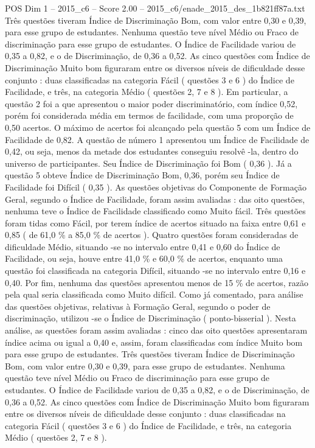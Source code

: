 \begin{textsample}{POS Dim 1 – 2015\_c6 – Score 2.00 – 2015\_c6/enade\_2015\_des\_1b821ff87a.txt}
Três questões tiveram Índice de Discriminação Bom, com valor entre 0,30 e 0,39, para esse grupo de estudantes.
Nenhuma questão teve nível Médio ou Fraco de discriminação para esse grupo de estudantes.
O Índice de Facilidade variou de 0,35 a 0,82, e o de Discriminação, de 0,36 a 0,52.
As cinco questões com Índice de Discriminação Muito bom figuraram entre os diversos níveis de dificuldade desse conjunto : duas classificadas na categoria Fácil ( questões 3 e 6 ) do Índice de Facilidade, e três, na categoria Médio ( questões 2, 7 e 8 ).
Em particular, a questão 2 foi a que apresentou o maior poder discriminatório, com índice 0,52, porém foi considerada média em termos de facilidade, com uma proporção de 0,50 acertos.
O máximo de acertos foi alcançado pela questão 5 com um Índice de Facilidade de 0,82.
A questão de número 1 apresentou um Índice de Facilidade de 0,42, ou seja, menos da metade dos estudantes conseguiu resolvê -la, dentro do universo de participantes.
Seu Índice de Discriminação foi Bom ( 0,36 ).
Já a questão 5 obteve Índice de Discriminação Bom, 0,36, porém seu Índice de Facilidade foi Difícil ( 0,35 ).
As questões objetivas do Componente de Formação Geral, segundo o Índice de Facilidade, foram assim avaliadas : das oito questões, nenhuma teve o Índice de Facilidade classificado como Muito fácil.
Três questões foram tidas como Fácil, por terem índice de acertos situado na faixa entre 0,61 e 0,85 ( de 61,0 \% a 85,0 \% de acertos ).
Quatro questões foram consideradas de dificuldade Médio, situando -se no intervalo entre 0,41 e 0,60 do Índice de Facilidade, ou seja, houve entre 41,0 \% e 60,0 \% de acertos, enquanto uma questão foi classificada na categoria Difícil, situando -se no intervalo entre 0,16 e 0,40.
Por fim, nenhuma das questões apresentou menos de 15 \% de acertos, razão pela qual seria classificada como Muito difícil.
Como já comentado, para análise das questões objetivas, relativas à Formação Geral, segundo o poder de discriminação, utilizou -se o Índice de Discriminação ( ponto-bisserial ).
Nesta análise, as questões foram assim avaliadas : cinco das oito questões apresentaram índice acima ou igual a 0,40 e, assim, foram classificadas com índice Muito bom para esse grupo de estudantes.
Três questões tiveram Índice de Discriminação Bom, com valor entre 0,30 e 0,39, para esse grupo de estudantes.
Nenhuma questão teve nível Médio ou Fraco de discriminação para esse grupo de estudantes.
O Índice de Facilidade variou de 0,35 a 0,82, e o de Discriminação, de 0,36 a 0,52.
As cinco questões com Índice de Discriminação Muito bom figuraram entre os diversos níveis de dificuldade desse conjunto : duas classificadas na categoria Fácil ( questões 3 e 6 ) do Índice de Facilidade, e três, na categoria Médio ( questões 2, 7 e 8 ).

\end{textsample}
